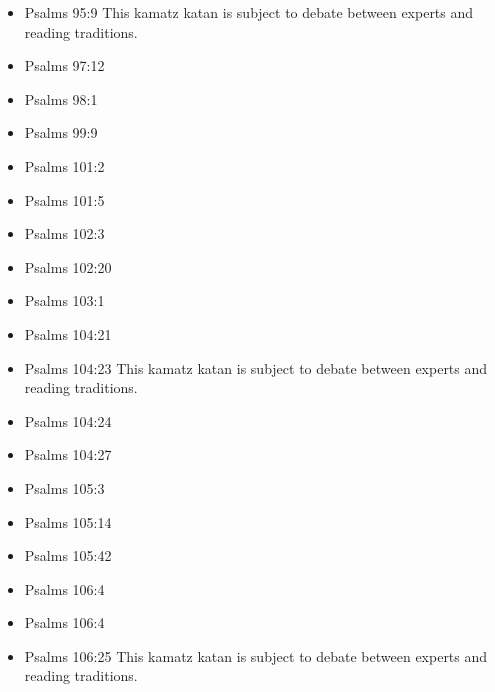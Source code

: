 \documentclass[14pt]{article}
\begin{document}
\begin{multicols}{2}
\begin{itemize}
					\item Psalms 95:9 This kamatz katan is subject to debate between experts and reading traditions.
					
					\item Psalms 97:12
					
					\item Psalms 98:1
					
					\item Psalms 99:9
					
					\item Psalms 101:2
					
					\item Psalms 101:5
					
					\item Psalms 102:3
					
					\item Psalms 102:20
					
					\item Psalms 103:1
					
					\item Psalms 104:21
					
					\item Psalms 104:23 This kamatz katan is subject to debate between experts and reading traditions.
					
					\item Psalms 104:24
					
					\item Psalms 104:27
					
					\item Psalms 105:3
					
					\item Psalms 105:14
			
					
					\item Psalms 105:42
					
					\item Psalms 106:4
					
					\item Psalms 106:4
					
					\item Psalms 106:25 This kamatz katan is subject to debate between experts and reading traditions.
					

\end{itemize}
\end{multicols}
\end{document}

